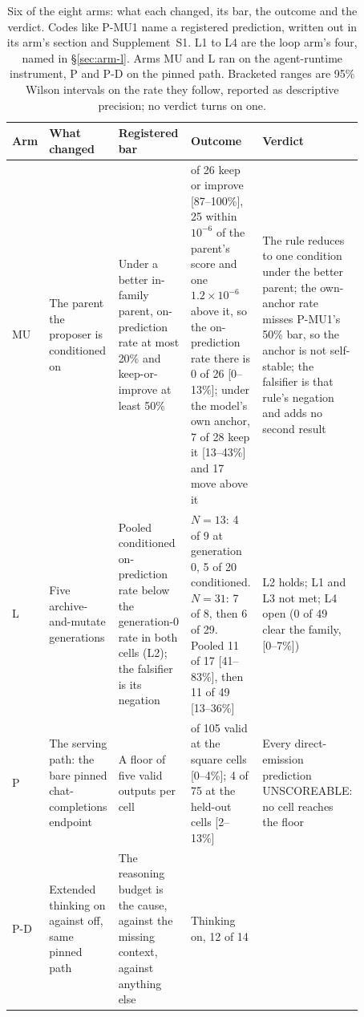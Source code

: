 \begin{table}[!ht]
\caption{Six of the eight arms: what each changed, its bar, the outcome
and the verdict. Codes like P-MU1 name a registered prediction,
written out in its arm's section and Supplement~S1. L1 to L4 are the loop arm's
four, named in \S\ref{sec:arm-l}. Arms MU and L ran on the agent-runtime instrument, P and
P-D on the pinned path. Bracketed ranges are 95\% Wilson intervals on the rate they follow, reported as descriptive precision; no verdict turns on one.}
\label{tab:overview}
\begin{center}
\footnotesize
\setlength{\tabcolsep}{3pt}
\begin{tabular}{@{}>{\raggedright\arraybackslash}p{0.05\linewidth}>{\raggedright\arraybackslash}p{0.15\linewidth}>{\raggedright\arraybackslash}p{0.24\linewidth}>{\raggedright\arraybackslash}p{0.22\linewidth}>{\raggedright\arraybackslash}p{0.21\linewidth}@{}}
\toprule
Arm & What changed & Registered bar & Outcome & Verdict \\
\midrule
MU & The parent the proposer is conditioned on & Under a better in-family parent, on-prediction rate
at most 20\% and keep-or-improve at least 50\% & 26 of 26 keep or improve [87--100\%], 25 within $10^{-6}$ of the parent's score and one
$1.2\times10^{-6}$ above it, so the on-prediction rate there is 0 of 26 [0--13\%]; under the model's
own anchor, 7 of 28 keep it [13--43\%] and 17 move above it & The rule reduces to one
condition under the better parent; the own-anchor rate misses P-MU1's 50\% bar, so the
anchor is not self-stable; the falsifier is that rule's negation and adds no second result \\
\addlinespace
L & Five archive-and-mutate generations & Pooled conditioned on-prediction rate below the
generation-0 rate in both cells (L2); the falsifier is its negation & $N = 13$: 4 of 9 at generation 0, 5 of
20 conditioned. $N = 31$: 7 of 8, then 6 of 29. Pooled 11 of 17 [41--83\%], then 11 of 49
[13--36\%] & L2 holds; L1 and L3 not met; L4 open (0 of 49 clear the family, [0--7\%]) \\
\addlinespace
P & The serving path: the bare pinned chat-completions endpoint & A floor of five valid
outputs per cell & 0 of 105 valid at the square cells [0--4\%]; 4 of 75 at the held-out cells
[2--13\%] & Every direct-emission prediction UNSCOREABLE: no cell reaches the floor \\
\addlinespace
P-D & Extended thinking on against off, same pinned path & The reasoning budget is the cause,
against the missing context, against anything else & Thinking on, 12 of 14

\end{tabular}
\end{center}
\end{table}
